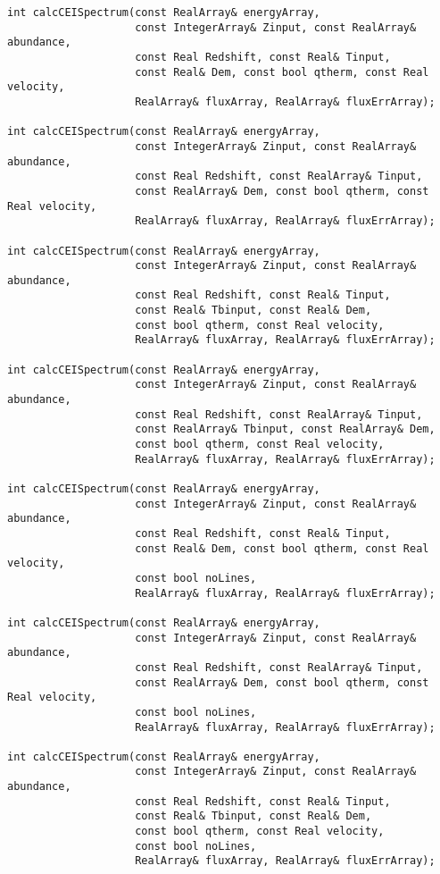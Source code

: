 \documentclass[11pt]{book}
\begin{document}
\begin{verbatim}
int calcCEISpectrum(const RealArray& energyArray, 
                    const IntegerArray& Zinput, const RealArray& abundance,
                    const Real Redshift, const Real& Tinput,
                    const Real& Dem, const bool qtherm, const Real velocity,
                    RealArray& fluxArray, RealArray& fluxErrArray);

int calcCEISpectrum(const RealArray& energyArray, 
                    const IntegerArray& Zinput, const RealArray& abundance,
                    const Real Redshift, const RealArray& Tinput,
                    const RealArray& Dem, const bool qtherm, const Real velocity,
                    RealArray& fluxArray, RealArray& fluxErrArray);

int calcCEISpectrum(const RealArray& energyArray, 
                    const IntegerArray& Zinput, const RealArray& abundance,
                    const Real Redshift, const Real& Tinput,
                    const Real& Tbinput, const Real& Dem, 
                    const bool qtherm, const Real velocity,
                    RealArray& fluxArray, RealArray& fluxErrArray);

int calcCEISpectrum(const RealArray& energyArray, 
                    const IntegerArray& Zinput, const RealArray& abundance,
                    const Real Redshift, const RealArray& Tinput,
                    const RealArray& Tbinput, const RealArray& Dem, 
                    const bool qtherm, const Real velocity,
                    RealArray& fluxArray, RealArray& fluxErrArray);

int calcCEISpectrum(const RealArray& energyArray, 
                    const IntegerArray& Zinput, const RealArray& abundance,
                    const Real Redshift, const Real& Tinput,
                    const Real& Dem, const bool qtherm, const Real velocity,
                    const bool noLines,
                    RealArray& fluxArray, RealArray& fluxErrArray);

int calcCEISpectrum(const RealArray& energyArray, 
                    const IntegerArray& Zinput, const RealArray& abundance,
                    const Real Redshift, const RealArray& Tinput,
                    const RealArray& Dem, const bool qtherm, const Real velocity,
                    const bool noLines,
                    RealArray& fluxArray, RealArray& fluxErrArray);

int calcCEISpectrum(const RealArray& energyArray, 
                    const IntegerArray& Zinput, const RealArray& abundance,
                    const Real Redshift, const Real& Tinput,
                    const Real& Tbinput, const Real& Dem, 
                    const bool qtherm, const Real velocity,
                    const bool noLines,
                    RealArray& fluxArray, RealArray& fluxErrArray);


\end{verbatim}
\end{document}
